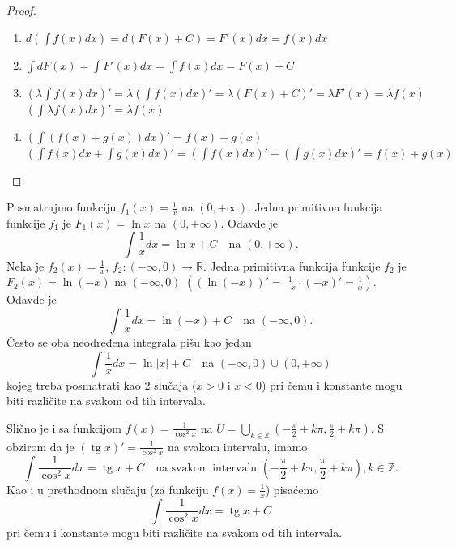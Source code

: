 \documentclass[a4paper,12pt,twoside]{report}
\numberwithin{algorithm}{section}
\begin{document}
\begin{proof}\
    \begin{enumerate}[label=\alph*)]
        \item \(d\left(\int f(x) dx\right) = d(F(x) + C) = F'(x) dx = f(x) dx\)
        \item \(\int dF(x) = \int F'(x) dx = \int f(x) dx = F(x) + C\)
        \item \(\left(\lambda \int f(x) dx\right)' = \lambda \left(\int f(x) dx\right)' = \lambda (F(x) + C)' = \lambda F'(x) = \lambda f(x)\) \\
        \(\left(\int \lambda f(x) dx\right)' = \lambda f(x)\)
        \item \(\left(\int (f(x) + g(x)) dx\right)' = f(x) + g(x)\) \\
        \(\left(\int f(x) dx + \int g(x) dx\right)' = \left(\int f(x) dx\right)' + \left(\int g(x) dx\right)' = f(x) + g(x)\)
    \end{enumerate}
\end{proof}

Posmatrajmo funkciju \(f_1(x) = \frac{1}{x}\) na \((0, +\infty)\). Jedna primitivna funkcija funkcije \(f_1\) je \(F_1(x) = \ln x\) na \((0, +\infty)\). Odavde je
\[
    \int \frac{1}{x} dx = \ln x + C \quad \text{na } (0, +\infty).
\]
Neka je \(f_2(x) = \frac{1}{x}\), \(f_2: (-\infty, 0) \to \mathbb{R}\). Jedna primitivna funkcija funkcije \(f_2\) je \linebreak\(F_2(x) = \ln(-x)\) na \((-\infty, 0)\) \(\left((\ln(-x))' = \frac{1}{-x} \cdot (-x)' = \frac{1}{x}\right)\).
Odavde je
\[
    \int \frac{1}{x} dx = \ln(-x) + C \quad \text{na } (-\infty, 0).
\]
Često se oba neodređena integrala pišu kao jedan
\[
    \int \frac{1}{x} dx = \ln|x| + C \quad \text{na } (-\infty, 0) \cup (0, +\infty)
\]
kojeg treba posmatrati kao 2 slučaja (\(x > 0\) i \(x < 0\)) pri čemu i konstante mogu biti različite na svakom od tih intervala.

Slično je i sa funkcijom \(f(x) = \frac{1}{\cos^2 x}\) na \(U = \bigcup_{k \in \mathbb{Z}} \left(-\frac{\pi}{2} + k\pi, \frac{\pi}{2} + k\pi\right)\).
S obzirom da je \((\operatorname{tg} x)' = \frac{1}{\cos^2 x}\) na svakom intervalu,
imamo
\[
    \int \frac{1}{\cos^2 x} dx = \operatorname{tg} x + C \quad \text{na svakom intervalu } \left(-\frac{\pi}{2} + k\pi, \frac{\pi}{2} + k\pi\right), k \in \mathbb{Z}.
\]
Kao i u prethodnom slučaju (za funkciju \(f(x) = \frac{1}{x}\)) pisaćemo
\[
    \int \frac{1}{\cos^2 x} dx = \operatorname{tg} x + C
\]
pri čemu i konstante mogu biti različite na svakom od tih intervala.
\end{document}

